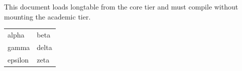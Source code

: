 \documentclass[11pt]{article}
\begin{document}
This document loads longtable from the core tier and must compile without mounting
the academic tier.

\begin{longtable}{ll}
alpha & beta \\
gamma & delta \\
epsilon & zeta \\
\end{longtable}
\end{document}
